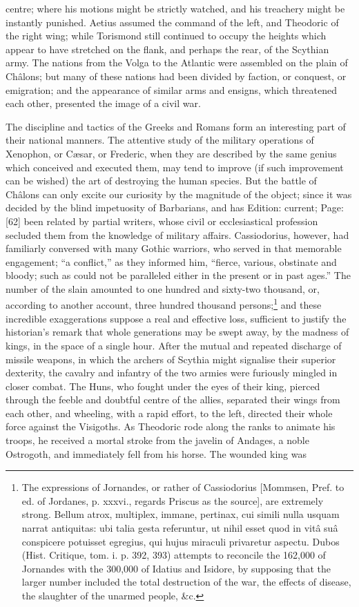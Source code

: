 centre; where his motions might be strictly watched, and his treachery might be instantly punished. Aetius assumed the command of the left, and Theodoric of the right wing; while Torismond still continued to occupy the heights which appear to have stretched on the flank, and perhaps the rear, of the Scythian army. The nations from the Volga to the Atlantic were assembled on the plain of Châlons; but many of these nations had been divided by faction, or conquest, or emigration; and the appearance of similar arms and ensigns, which threatened each other, presented the image of a civil war.

The discipline and tactics of the Greeks and Romans form an interesting part of their national manners. The attentive study of the military operations of Xenophon, or Cæsar, or Frederic, when they are described by the same genius which conceived and executed them, may tend to improve (if such improvement can be wished) the art of destroying the human species. But the battle of Châlons can only excite our curiosity by the magnitude of the object; since it was decided by the blind impetuosity of Barbarians, and has Edition: current; Page: [62] been related by partial writers, whose civil or ecclesiastical profession secluded them from the knowledge of military affairs. Cassiodorius, however, had familiarly conversed with many Gothic warriors, who served in that memorable engagement; \texthebrew{“}a conflict,\texthebrew{}” as they informed him, \texthebrew{“}fierce, various, obstinate and bloody; such as could not be paralleled either in the present or in past ages.\texthebrew{}” The number of the slain amounted to one hundred and sixty-two thousand, or, according to another account, three hundred thousand persons;\footnote{The expressions of Jornandes, or rather of Cassiodorius [Mommsen, Pref. to ed. of Jordanes, p. xxxvi., regards Priscus as the source], are extremely strong. Bellum atrox, multiplex, immane, pertinax, cui simili nulla usquam narrat antiquitas: ubi talia gesta referuntur, ut nihil esset quod in vitâ suâ conspicere potuisset egregius, qui hujus miraculi privaretur aspectu. Dubos (Hist. Critique, tom. i. p. 392, 393) attempts to reconcile the 162,000 of Jornandes with the 300,000 of Idatius and Isidore, by supposing that the larger number included the total destruction of the war, the effects of disease, the slaughter of the unarmed people, \&c.} and these incredible exaggerations suppose a real and effective loss, sufficient to justify the historian\texthebrew{}’s remark that whole generations may be swept away, by the madness of kings, in the space of a single hour. After the mutual and repeated discharge of missile weapons, in which the archers of Scythia might signalise their superior dexterity, the cavalry and infantry of the two armies were furiously mingled in closer combat. The Huns, who fought under the eyes of their king, pierced through the feeble and doubtful centre of the allies, separated their wings from each other, and wheeling, with a rapid effort, to the left, directed their whole force against the Visigoths. As Theodoric rode along the ranks to animate his troops, he received a mortal stroke from the javelin of Andages, a noble Ostrogoth, and immediately fell from his horse. The wounded king was 